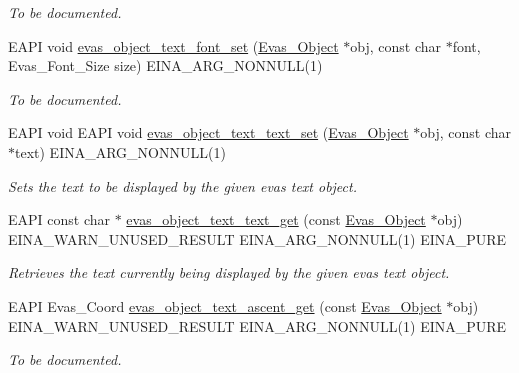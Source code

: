 \begin{DoxyCompactItemize}
\begin{DoxyCompactList}\small\item\em To be documented. \item\end{DoxyCompactList}\item 
EAPI void \hyperlink{group__Evas__Object__Text_ga6c7fc38657a876997ad91ebd177669a6}{evas\_\-object\_\-text\_\-font\_\-set} (\hyperlink{group__Evas__Object__Group_ga9e19e6dd1f517a0ba437c0114d3e7c97}{Evas\_\-Object} $\ast$obj, const char $\ast$font, Evas\_\-Font\_\-Size size) EINA\_\-ARG\_\-NONNULL(1)
\begin{DoxyCompactList}\small\item\em To be documented. \item\end{DoxyCompactList}\item 
EAPI void EAPI void \hyperlink{group__Evas__Object__Text_ga11d37807b5506e6cca746ebb91236532}{evas\_\-object\_\-text\_\-text\_\-set} (\hyperlink{group__Evas__Object__Group_ga9e19e6dd1f517a0ba437c0114d3e7c97}{Evas\_\-Object} $\ast$obj, const char $\ast$text) EINA\_\-ARG\_\-NONNULL(1)
\begin{DoxyCompactList}\small\item\em Sets the text to be displayed by the given evas text object. \item\end{DoxyCompactList}\item 
EAPI const char $\ast$ \hyperlink{group__Evas__Object__Text_gaef3b0b12eb63b9cd7574c1cf05afb7a8}{evas\_\-object\_\-text\_\-text\_\-get} (const \hyperlink{group__Evas__Object__Group_ga9e19e6dd1f517a0ba437c0114d3e7c97}{Evas\_\-Object} $\ast$obj) EINA\_\-WARN\_\-UNUSED\_\-RESULT EINA\_\-ARG\_\-NONNULL(1) EINA\_\-PURE
\begin{DoxyCompactList}\small\item\em Retrieves the text currently being displayed by the given evas text object. \item\end{DoxyCompactList}\item 
EAPI Evas\_\-Coord \hyperlink{group__Evas__Object__Text_ga4aaf7a903228927fa0adac885304e43e}{evas\_\-object\_\-text\_\-ascent\_\-get} (const \hyperlink{group__Evas__Object__Group_ga9e19e6dd1f517a0ba437c0114d3e7c97}{Evas\_\-Object} $\ast$obj) EINA\_\-WARN\_\-UNUSED\_\-RESULT EINA\_\-ARG\_\-NONNULL(1) EINA\_\-PURE
\begin{DoxyCompactList}\small\item\em To be documented. \item\end{DoxyCompactList}\item 

\end{DoxyCompactItemize}
